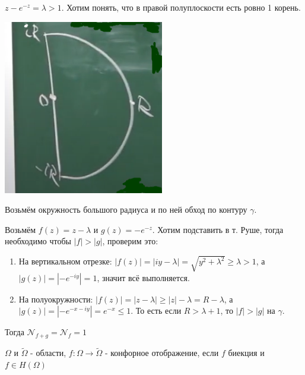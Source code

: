 \begin{example}
    $z - e^{-z} = \lambda > 1$. Хотим понять, что в правой полуплоскости есть ровно 1 корень.

    \begin{center}
        \includegraphics[width=7cm]{assets/04-functions-of-complex-variables/rushe-example.png}
    \end{center}

    Возьмём окружность большого радиуса и по ней обход по контуру $\gamma$.

    Возьмём $f(z) = z - \lambda$ и $g(z) = -e^{-z}$. Хотим подставить в т. Руше, тогда необходимо чтобы $|f| > |g|$, проверим это:

    \begin{enumerate}
        \item {
            На вертикальном отрезке: $|f(z)| = |iy - \lambda| = \sqrt{y^2 + \lambda^2} \geqslant \lambda > 1$, а
            $|g(z)| = |-e^{-iy}| = 1$, значит всё выполняется.
        }
        \item {
            На полуокружности: $|f(z)| = |z - \lambda| \geqslant |z| - \lambda = R - \lambda$, а $|g(z)| = |-e^{-x - iy}| = e^{-x} \leqslant 1$. То есть если $R > \lambda + 1$, то $|f| > |g|$ на $\gamma$.
        }
    \end{enumerate}

    Тогда $\mathcal{N}_{f + g} = \mathcal{N}_f = 1$
\end{example}


\begin{definition}
    $\Omega$ и $\tilde{\Omega}$ - области, $f: \Omega \to \tilde{\Omega}$ - конфорное отображение,
    если $f$ биекция и $f \in H(\Omega)$
\end{definition}

